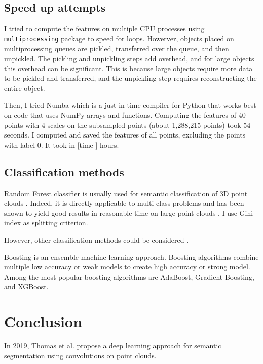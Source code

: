 \documentclass{article}
\begin{document}
\subsection{Speed up attempts}
I tried to compute the features on multiple CPU processes using \texttt{multiprocessing} package to speed for loops. Howerver, objects placed on multiprocessing queues are pickled, transferred over the queue, and then unpickled. The pickling and unpickling steps add overhead, and for large objects this overhead can be significant. This is because large objects require more data to be pickled and transferred, and the unpickling step requires reconstructing the entire object. 

Then, I tried Numba which is a just-in-time compiler for Python that works best on code that uses NumPy arrays and functions. Computing the features of 40 points with 4 scales on the subsampled points (about 1,288,215 points) took 54 seconds. I computed and saved the features of all points, excluding the points with label 0. It took in [time ] hours. 


\subsection{Classification methods}\label{sec:classification}
Random Forest classifier is usually used for semantic classification of 3D point clouds \cite{thomas_semantic_2018,hackel_fast_nodate}. Indeed, it is directly applicable to multi-class problems and has been shown to yield good results in reasonable time on large point clouds \cite{weinmann_semantic_2015,atik_machine_2021}. I use Gini index as splitting criterion.

However, other classification methods could be considered \cite{atik_machine_2021}. 

Boosting is an ensemble machine learning approach. Boosting algorithms combine multiple low accuracy or weak models to create high accuracy or strong model. Among the most popular boosting algorithms are AdaBoost, Gradient Boosting, and XGBoost.

\section{Conclusion}

In 2019, Thomas et al. \cite{thomas_kpconv_2019} propose a deep learning approach for semantic segmentation using convolutions on point clouds.
\end{document}
